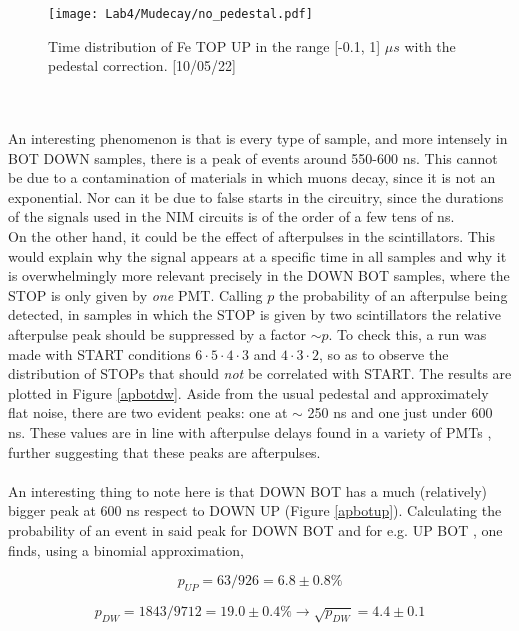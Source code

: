 \documentclass[10pt,a4paper,twocolumn]{article}
\begin{document}
\begin{figure}[h!]
\centering
\caption{Time distribution of Fe TOP UP in the range [-0.1, 1] $\mu s$ with the pedestal correction. [10/05/22]}
\texttt{[image: Lab4/Mudecay/no\_pedestal.pdf]} 
\label{pedestalcorrection}
\end{figure}
\\
\\
An interesting phenomenon is that is every type of sample, and more intensely in BOT DOWN samples, there is a peak of events around 550-600 ns. This cannot be due to a contamination of materials in which muons decay, since it is not an exponential. Nor can it be due to false starts in the circuitry, since the durations of the signals used in the NIM circuits is of the order of a few tens of ns.
\\
On the other hand, it could be the effect of afterpulses in the scintillators. This would explain why the signal appears at a specific time in all samples and why it is overwhelmingly more relevant precisely in the DOWN BOT samples, where the STOP is only given by \textit{one} PMT. Calling $p$ the probability of an afterpulse being detected, in samples in which the STOP is given by two scintillators the relative afterpulse peak should be suppressed by a factor $\sim p$. To check this, a run was made with START conditions $6\cdot 5\cdot 4 \cdot 3$ and $4\cdot 3\cdot 2$, so as to observe the distribution of STOPs that should \textit{not} be correlated with START. The results are plotted in Figure \ref{apbotdw}. Aside from the usual pedestal and approximately flat noise, there are two evident peaks: one at $\sim$ 250 ns and one just under 600 ns. These values are in line with afterpulse delays found in a variety of PMTs \cite{afterpulse2}, further suggesting that these peaks are afterpulses.
\\
\\
An interesting thing to note here is that DOWN BOT has a much (relatively) bigger peak at 600 ns respect to DOWN UP (Figure \ref{apbotup}). Calculating the probability of an event in said peak for DOWN BOT and for e.g. UP BOT , one finds, using a binomial approximation,

\bigbreak



\begin{equation*} 
p_{UP}  =63/926=6.8 \pm 0.8\% 
\end{equation*}

\begin{equation*} 
p_{DW}  =1843/9712=19.0 \pm 0.4\%  \rightarrow \sqrt{p_{DW}}=4.4 \pm 0.1
\end{equation*}
\end{document}
